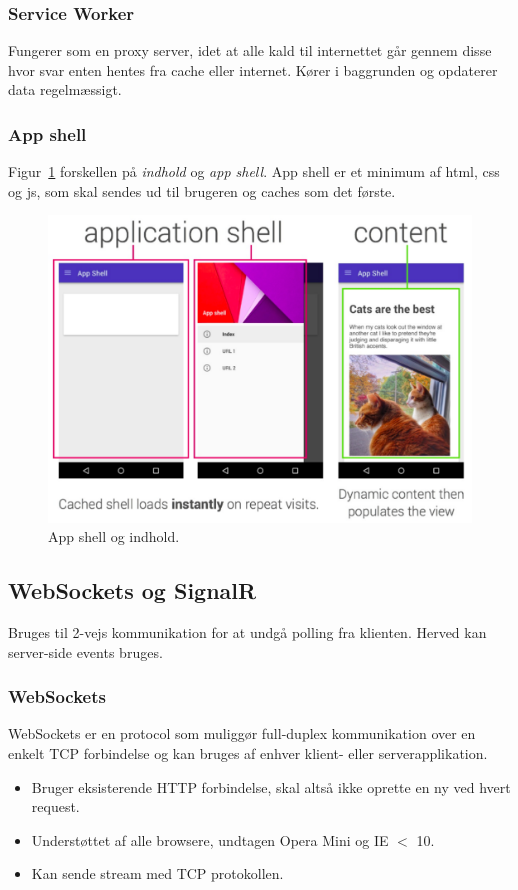\subsubsection{Service Worker}
Fungerer som en proxy server, idet at alle kald til internettet går gennem disse hvor svar enten hentes fra cache eller internet. Kører i baggrunden og opdaterer data regelmæssigt.

\subsubsection{App shell}
Figur~\ref{fig:app-shell} forskellen på \textit{indhold} og \textit{app shell}. App shell er et minimum af html, css og js, som skal sendes ud til brugeren og caches som det første.

\begin{figure}[H]
	\centering
	\includegraphics[width=0.8\linewidth]{figs/spm3/app-shell}
	\caption{App shell og indhold.}
	\label{fig:app-shell}
\end{figure}

\subsection{WebSockets og SignalR}
Bruges til 2-vejs kommunikation for at undgå polling fra klienten. Herved kan server-side events bruges.

\subsubsection{WebSockets}
WebSockets er en protocol som muliggør full-duplex kommunikation over en enkelt TCP forbindelse og kan bruges af enhver klient- eller serverapplikation.

\begin{itemize}
	\item Bruger eksisterende HTTP forbindelse, skal altså ikke oprette en ny ved hvert request. 
	\item Understøttet af alle browsere, undtagen Opera Mini og IE $<$ 10.
	\item Kan sende stream med TCP protokollen.
\end{itemize}

